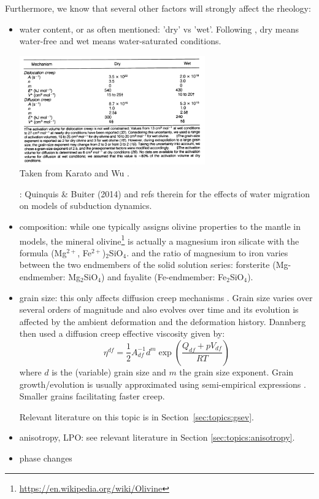 Furthermore, we know that several other factors will strongly affect the rheology:
\begin{itemize}
\item water content, or as often mentioned: 'dry' vs 'wet'. Following \cite{kawu93}, 
dry means water-free and wet means water-saturated conditions.
\begin{center}
\includegraphics[width=8cm]{images/rheology/kawu93}\\
{\captionfont Taken from Karato and Wu \cite{kawu93}.}
\end{center}
\Literature: Quinquis \& Buiter (2014) \cite{qubu14} and refs therein for the effects of water
migration on models of subduction dynamics.

\item composition: while one typically assigns olivine properties to the mantle in models, 
the mineral olivine\footnote{\url{https://en.wikipedia.org/wiki/Olivine}} 
is actually a magnesium iron silicate with the formula (Mg$^{2+}$, Fe$^{2+}$)$_2$SiO$_4$.
and the ratio of magnesium to iron varies between the two endmembers of the solid solution series: 
forsterite (Mg-endmember: Mg$_2$SiO$_4$) and fayalite (Fe-endmember: Fe$_2$SiO$_4$).

\item grain size: this only affects diffusion creep mechanisms \cite{kawu93}. 
Grain size varies over several orders of magnitude and also evolves over time and 
its evolution is affected by the ambient deformation and the deformation history.
Dannberg \etal \cite{daef17} then used a diffusion creep effective viscosity 
given by:
\[
\eta^{df} = \frac{1}{2} A_{df}^{-1} d^m \exp \left( \frac{Q_{df}+pV_{df}}{RT}  \right)
\] 
where $d$ is the (variable) grain size and $m$ the grain size exponent. Grain growth/evolution 
is usually approximated using semi-empirical expressions \cite[section~2.2]{daef17}.
Smaller grains facilitating faster creep.

Relevant literature on this topic is in Section~\ref{sec:topics:gsev}.

\item anisotropy, LPO: see relevant literature in Section \ref{sec:topics:anisotropy}.

\item phase changes 
\end{itemize}

